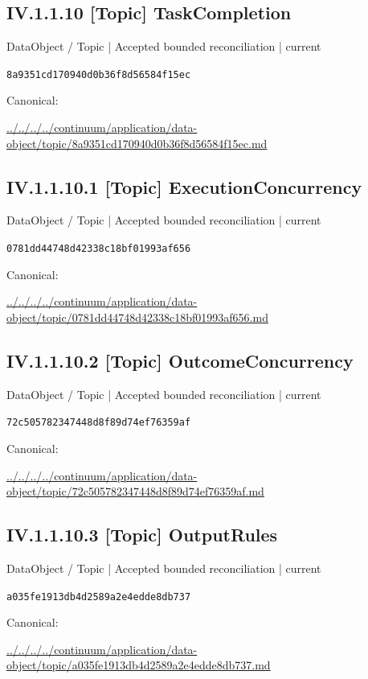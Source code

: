 \documentclass[10pt,a4paper]{article}
\begin{document}
\subsection*{IV.1.1.10 [Topic] TaskCompletion}
\label{element-8a9351cd170940d0b36f8d56584f15ec}
{\small DataObject / Topic | Accepted bounded reconciliation | current}\par
\texttt{8a9351cd170940d0b36f8d56584f15ec}\par
Canonical: \par
{\footnotesize\url{../../../../continuum/application/data-object/topic/8a9351cd170940d0b36f8d56584f15ec.md}}\par
\subsection*{IV.1.1.10.1 [Topic] ExecutionConcurrency}
\label{element-0781dd44748d42338c18bf01993af656}
{\small DataObject / Topic | Accepted bounded reconciliation | current}\par
\texttt{0781dd44748d42338c18bf01993af656}\par
Canonical: \par
{\footnotesize\url{../../../../continuum/application/data-object/topic/0781dd44748d42338c18bf01993af656.md}}\par
\subsection*{IV.1.1.10.2 [Topic] OutcomeConcurrency}
\label{element-72c505782347448d8f89d74ef76359af}
{\small DataObject / Topic | Accepted bounded reconciliation | current}\par
\texttt{72c505782347448d8f89d74ef76359af}\par
Canonical: \par
{\footnotesize\url{../../../../continuum/application/data-object/topic/72c505782347448d8f89d74ef76359af.md}}\par
\subsection*{IV.1.1.10.3 [Topic] OutputRules}
\label{element-a035fe1913db4d2589a2e4edde8db737}
{\small DataObject / Topic | Accepted bounded reconciliation | current}\par
\texttt{a035fe1913db4d2589a2e4edde8db737}\par
Canonical: \par
{\footnotesize\url{../../../../continuum/application/data-object/topic/a035fe1913db4d2589a2e4edde8db737.md}}\par
\end{document}

